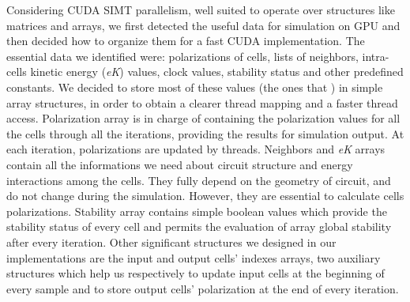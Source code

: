 Considering CUDA SIMT parallelism, well suited to operate over structures like matrices and arrays, we first detected the useful data
for simulation on GPU and then decided how to organize them for a fast CUDA implementation.\newline
The essential data we identified were: polarizations of cells, lists of neighbors, intra-cells kinetic energy (\textit{eK}) values, clock values,
stability status and other predefined constants.\newline
We decided to store most of these values (the ones that ) in simple array structures, in order to obtain a clearer thread mapping and a faster thread access.\newline
Polarization array is in charge of containing the polarization values for all the cells through all the iterations, providing
the results for simulation output. At each iteration, polarizations are updated by threads.\newline
Neighbors and \textit{eK} arrays contain all the informations we need about circuit structure and energy interactions among
the cells. They fully depend on the geometry of circuit, and do not change during the simulation. However, they are essential to calculate 
cells polarizations.\newline
Stability array contains simple boolean values which provide the stability status of every cell and permits the evaluation of array global
stability after every iteration.\newline
Other significant structures we designed in our implementations are the input and output cells' indexes arrays, two auxiliary structures
which help us respectively to update input cells at the beginning of every sample and to store output cells' polarization at the end of 
every iteration.

